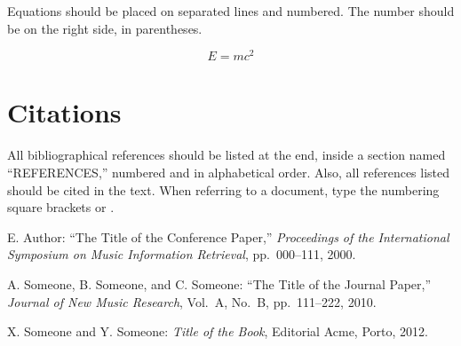 \documentclass{article}
\begin{document}
Equations should be placed on separated lines and numbered.
The number should be on the right side, in parentheses.

\begin{equation}
E=mc^{2}
\end{equation}

\section{Citations}

All bibliographical references should be listed at the end,
inside a section named ``REFERENCES,'' numbered and in alphabetical order.
Also, all references listed should be cited in the text.
When referring to a document, type the numbering square brackets
\cite{Author:00} or \cite{Author:00,Someone:10,Someone:04}.

\begin{thebibliography}{citations}

E. Author:
``The Title of the Conference Paper,''
{\it Proceedings of the International Symposium
on Music Information Retrieval}, pp.~000--111, 2000.

A. Someone, B. Someone, and C. Someone:
``The Title of the Journal Paper,''
{\it Journal of New Music Research},
Vol.~A, No.~B, pp.~111--222, 2010.

 X. Someone and Y. Someone: {\it Title of the Book},
    Editorial Acme, Porto, 2012.

\end{thebibliography}

%
\end{document}

